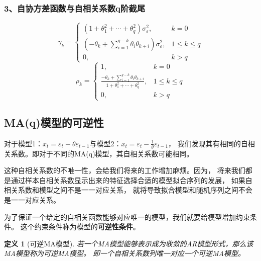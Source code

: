 \documentclass[12pt, a4paper, oneside]{ctexbook}
\newtheorem{definition}[theorem]{定义}
\begin{document}
\subsubsection{3、自协方差函数与自相关系数q阶截尾}
\begin{equation}
    \gamma_k=
    \begin{cases}
        (1+\theta_1^2+\cdots+\theta_q^2)\sigma_\varepsilon^2,                 & k=0            \\
        (-\theta_k+\sum_{i=1}^{q-k}\theta_i\theta_{k+i})\sigma_\varepsilon^2, & 1\leq  k\leq q \\
        0,                                                                    & k>q
    \end{cases}
\end{equation}
\begin{equation}
    \rho_k=\begin{cases}
        1,                                                                                     & k=0            \\
        \frac{-\theta_k+\sum_{i=1}^{q-k}\theta_i\theta_{k+i}}{1+\theta_1^2+\cdots+\theta_q^2}, & 1\leq  k\leq q \\
        0,                                                                                     & k>q
    \end{cases}
\end{equation}

\subsection{MA(q)模型的可逆性}
对于模型1：$x_t=\varepsilon_t-\theta\varepsilon_{t-1}$与模型2：$x_t=\varepsilon_t-\frac{1}{\theta}\varepsilon_{t-1}$，
我们发现其有相同的自相关系数。即对于不同的MA(q)模型，其自相关系数可能相同。

这种自相关系数的不唯一性，会给我们将来的工作增加麻烦。因为，
将来我们都是通过样本自相关系数显示出来的特征选择合适的模型拟合序列的发展，
如果自相关系数和模型之间不是一一对应关系，
就将导致拟合模型和随机序列之间不会是一一对应关系。

为了保证一个给定的自相关函数能够对应唯一的模型，我们就要给模型增加约束条件。
这个约束条件称为模型的\textbf{可逆性条件}。

\begin{definition}[可逆MA模型]
    若一个MA模型能够表示成为收敛的AR模型形式，那么该MA模型称为可逆MA模型。
    即一个自相关系数列唯一对应一个可逆MA模型。
\end{definition}
\end{document}
